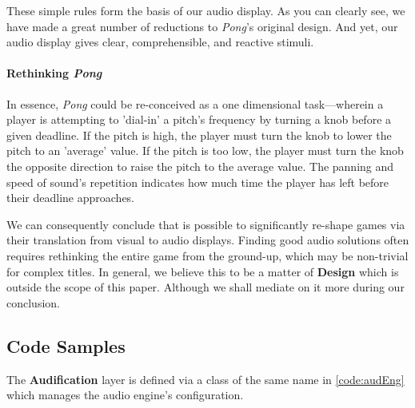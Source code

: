 \documentclass{report}
\newcommand{\design}{\textbf{Design}\xspace}
\newcommand{\audio}{\textbf{Audification}\xspace}
\begin{document}
These simple rules form the basis of our audio display. As you can clearly see, we have made a great number of reductions to \emph{Pong}'s original design. And yet, our audio display gives clear, comprehensible, and reactive stimuli. 

\paragraph{Rethinking \emph{Pong}}

In essence, \emph{Pong} could be re-conceived as a one dimensional task---wherein a player is attempting to 'dial-in' a pitch's frequency by turning a knob before a given deadline. If the pitch is high, the player must turn the knob to lower the pitch to an 'average' value. If the pitch is too low, the player must turn the knob the opposite direction to raise the pitch to the average value. The panning and speed of sound's repetition indicates how much time the player has left before their deadline approaches.

We can consequently conclude that is possible to significantly re-shape games via their translation from visual to audio displays. Finding good audio solutions often requires rethinking the entire game from the ground-up, which may be non-trivial for complex titles. In general, we believe this to be a matter of \design which is outside the scope of this paper. Although we shall mediate on it more during our conclusion.

\subsection{Code Samples}
The \audio layer is defined via a class of the same name in \cref{code:audEng} which manages the audio engine's configuration.
\end{document}
